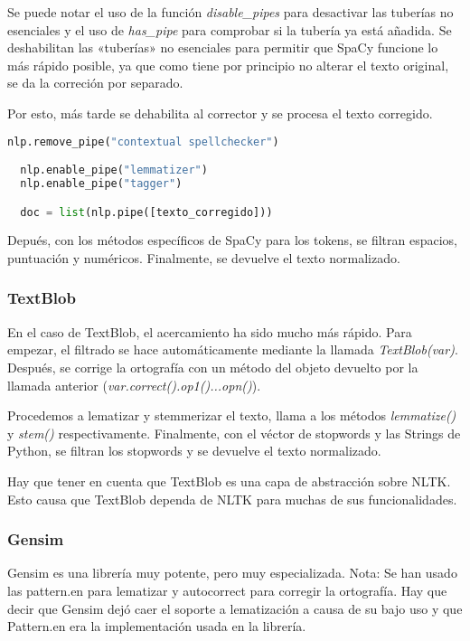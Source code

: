 \documentclass[a4paper,twocolumn]{article}
\begin{document}
    Se puede notar el uso de la función \textit{disable\_pipes} para desactivar las tuberías no esenciales y el uso de \textit{has\_pipe} para comprobar si la tubería ya está añadida.
    Se deshabilitan las «tuberías» no esenciales para permitir que SpaCy funcione lo más rápido posible,
    ya que como tiene por principio no alterar el texto original, se da la correción por separado.

    Por esto, más tarde se dehabilita al corrector y se procesa el texto corregido.

    \begin{lstlisting}[language=Python,label={lst:codigoSpellSpacy2},basicstyle=\scriptsize]
nlp.remove_pipe("contextual spellchecker")

  nlp.enable_pipe("lemmatizer")
  nlp.enable_pipe("tagger")

  doc = list(nlp.pipe([texto_corregido]))
    \end{lstlisting}

    Depués, con los métodos específicos de SpaCy para los tokens, se filtran espacios, puntuación y numéricos.
    Finalmente, se devuelve el texto normalizado.

    \subsubsection{TextBlob}\label{subsubsec:textblob_impl}
    En el caso de TextBlob, el acercamiento ha sido mucho más rápido.
    Para empezar, el filtrado se hace automáticamente mediante la llamada \textit{TextBlob(var)}.
    Después, se corrige la ortografía con un método del objeto devuelto por la llamada anterior (\textit{var.correct().op1()...opn()}).

    Procedemos a lematizar y stemmerizar el texto, llama a los métodos \textit{lemmatize()} y \textit{stem()} respectivamente.
    Finalmente, con el véctor de stopwords y las Strings de Python, se filtran los stopwords y se devuelve el texto normalizado.

    Hay que tener en cuenta que TextBlob es una capa de abstracción sobre NLTK.
    Esto causa que TextBlob dependa de NLTK para muchas de sus funcionalidades.

    \subsubsection{Gensim}\label{subsubsec:gensim_impl}
    Gensim es una librería muy potente, pero muy especializada.
    Nota: Se han usado las pattern.en para lematizar y autocorrect para corregir la ortografía.
    Hay que decir que Gensim dejó caer el soporte a lematización a causa de su bajo uso y que Pattern.en era la implementación usada en la librería.
\end{document}

